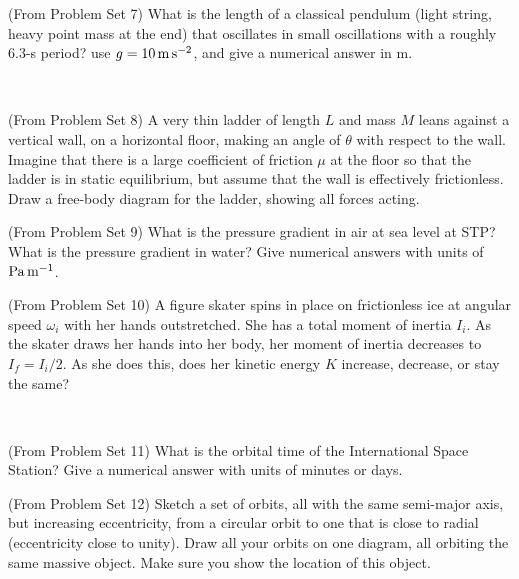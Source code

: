 \documentclass[12pt, letterpaper]{article}
\begin{document}
\vfill

\begin{problem} (From Problem Set 7)
  What is the length of a classical pendulum (light string, heavy point
  mass at the end) that oscillates in small oscillations with a roughly
  6.3-s period? use $g=10\,\mathrm{m}\,\mathrm{s}^{-2}$, and give a numerical answer in m.
\end{problem}

\vfill
~\clearpage

\begin{problem} (From Problem Set 8)
  A very thin ladder of length $L$ and mass $M$ leans against a vertical
  wall, on a horizontal floor, making an angle of $\theta$ with respect
  to the wall.  Imagine that there is a large coefficient of friction
  $\mu$ at the floor so that the ladder is in static
  equilibrium, but assume that the wall is effectively frictionless.
  Draw a free-body diagram for the ladder, showing all
  forces acting.
\end{problem}

\vfill

\begin{problem} (From Problem Set 9)
  What is the pressure gradient in air at sea level at STP?
  What is the pressure gradient in water?
  Give numerical answers with units of $\mathrm{Pa}\,\mathrm{m}^{-1}$.
\end{problem}

\vfill

\begin{problem} (From Problem Set 10)
  A figure skater spins in place on frictionless ice at
  angular speed $\omega_i$ with her hands outstretched.  She has a total
  moment of inertia $I_i$.  As the skater draws her hands into her body,
  her moment of inertia decreases to $I_f=I_i/2$. As she does this, does her kinetic
  energy $K$ increase, decrease, or stay the same?
\end{problem}

\vfill
~\clearpage

\begin{problem} (From Problem Set 11)
  What is the orbital time of the International Space Station?
  Give a numerical answer with units of minutes or days.
\end{problem}

\vfill

\begin{problem} (From Problem Set 12)
  Sketch a set of orbits, all with the same semi-major axis, but increasing
  eccentricity, from a circular orbit to one that is close to radial
  (eccentricity close to unity). Draw all your orbits on one diagram, all orbiting the same
  massive object. Make sure you show the location of this object.
\end{problem}
\end{document}

